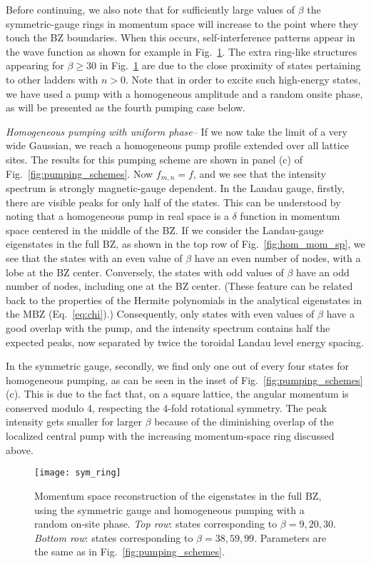 Before continuing, we also note that for sufficiently large values of $\beta$ the symmetric-gauge rings in momentum space will increase to the point where they touch the BZ boundaries. When this occurs, self-interference patterns appear in the wave function as shown for example in Fig.~\ref{fig:torus_edge}. The extra ring-like structures appearing for $\beta \geq 30$ in Fig.~\ref{fig:torus_edge} are due to the close proximity of states pertaining to other ladders with
$n >0$. Note that in order to excite such high-energy states, we have used a pump with a homogeneous amplitude and a random onsite phase, as will be presented as the fourth pumping case below. 

{\em{Homogeneous pumping with uniform phase--}} If we now take the limit of a very wide Gaussian, we reach a homogeneous pump profile extended over all lattice sites. The results for this pumping scheme are shown in panel (c) of
Fig.~\ref{fig:pumping_schemes}. Now $f_{m,n} = f$, and we see that the intensity spectrum is strongly magnetic-gauge dependent. In the Landau gauge, firstly, there are visible peaks for only
half of the states. This can be understood by noting that a homogeneous pump in real space is a $\delta$ function in momentum space centered in the
middle of the BZ. If we consider the Landau-gauge eigenstates in the full BZ, as shown
in the top row of Fig.~\ref{fig:hom_mom_sp}, we see that the states with an even
value of $\beta$ have an even number of nodes, with a lobe at the BZ
center. Conversely, the states with odd values of $\beta$ have an odd number of nodes, including one at the BZ center. (These feature can be related back to the properties of the Hermite polynomials in the analytical eigenstates in the MBZ (Eq.~\eqref{eq:chi}).) Consequently, only states with even values of $\beta$ have a good overlap with the pump, and the intensity spectrum contains half the expected peaks, now separated by twice the toroidal Landau level energy spacing.  

In the symmetric gauge, secondly, we find only one out of every four
states for homogeneous pumping, as can be seen in the inset of Fig.~\ref{fig:pumping_schemes}
(c). This is due to the fact that, on a square lattice, the angular
momentum is conserved modulo 4, respecting the 4-fold rotational
symmetry. The peak intensity gets smaller for larger $\beta$ because
of the diminishing overlap of the localized central pump with the
increasing momentum-space ring discussed above.

\begin{figure}[tb]
  \centering
  \texttt{[image: sym\_ring]} %
  \caption{Momentum space reconstruction of the eigenstates in the
    full BZ, using the symmetric gauge and homogeneous pumping with a random on-site
    phase. \emph{Top row}: states corresponding to
    $\beta = 9, 20, 30$.  \emph{Bottom row}: states corresponding to
    $\beta = 38, 59, 99$. Parameters are the same as in Fig.~\ref{fig:pumping_schemes}.}
  \label{fig:torus_edge}
\end{figure}


